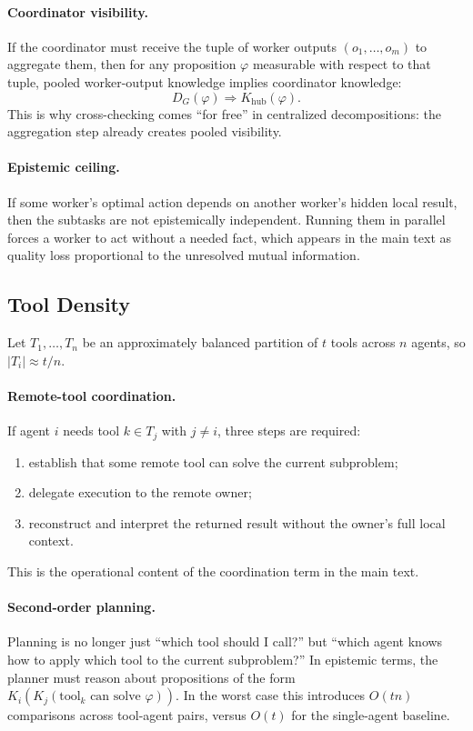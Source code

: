 \paragraph{Coordinator visibility.}
If the coordinator must receive the tuple of worker outputs $(o_1,\dots,o_m)$ to aggregate them, then
for any proposition $\varphi$ measurable with respect to that tuple, pooled worker-output knowledge
implies coordinator knowledge:
\[
D_G(\varphi) \Rightarrow K_{\mathrm{hub}}(\varphi).
\]
This is why cross-checking comes ``for free'' in centralized decompositions: the aggregation step already
creates pooled visibility.

\paragraph{Epistemic ceiling.}
If some worker's optimal action depends on another worker's hidden local result, then the subtasks are not
epistemically independent. Running them in parallel forces a worker to act without a needed fact, which
appears in the main text as quality loss proportional to the unresolved mutual information.

\subsection{Tool Density}

Let $T_1,\dots,T_n$ be an approximately balanced partition of $t$ tools across $n$ agents, so
$|T_i| \approx t/n$.

\paragraph{Remote-tool coordination.}
If agent $i$ needs tool $k \in T_j$ with $j \ne i$, three steps are required:
\begin{enumerate}[leftmargin=*]
\item establish that some remote tool can solve the current subproblem;
\item delegate execution to the remote owner;
\item reconstruct and interpret the returned result without the owner's full local context.
\end{enumerate}
This is the operational content of the coordination term in
the main text.

\paragraph{Second-order planning.}
Planning is no longer just ``which tool should I call?'' but
``which agent knows how to apply which tool to the current subproblem?'' In epistemic terms, the planner
must reason about propositions of the form
$K_i(K_j(\mathrm{tool}_k \text{ can solve } \varphi))$.
In the worst case this introduces $O(tn)$ comparisons across tool-agent pairs, versus $O(t)$ for the
single-agent baseline.
